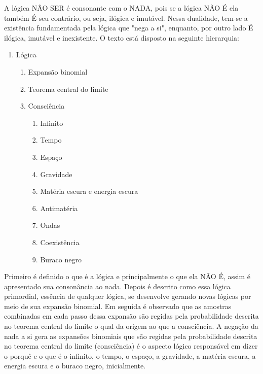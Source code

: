 A lógica NÃO SER é consonante com o NADA, pois se a lógica NÃO É ela também É seu contrário, ou seja, ilógica e imutável. Nessa dualidade, tem-se a existência fundamentada pela lógica que "nega a si", enquanto, por outro lado É ilógica, imutável e inexistente. O texto está disposto na seguinte hierarquia:
{\small
\begin{enumerate}[label*=\arabic*.]
   \item Lógica
   \begin{enumerate}[label*=\arabic*.]
	   \item Expansão binomial
	   \item Teorema central do limite
	   \item Consciência
		   \begin{enumerate}[label*=\arabic*.]
			   \item Infinito
			   \item Tempo
			   \item Espaço
			   \item Gravidade
			   \item Matéria escura e energia escura
			   \item Antimatéria
			   \item Ondas
			   \item Coexistência
			   \item Buraco negro
		   \end{enumerate}   
   \end{enumerate}
\end{enumerate}
}
Primeiro é definido o que é a lógica e principalmente o que ela NÃO É, assim é apresentado sua consonância ao nada. Depois é descrito como essa lógica primordial, essência de qualquer lógica, se desenvolve gerando novas lógicas por meio de sua expansão binomial. Em seguida é observado que as amostras combinadas em cada passo dessa expansão são regidas pela probabilidade descrita no teorema central do limite o qual da origem ao que a consciência. A negação da nada a si gera as expansões binomiais que são regidas pela probabilidade descrita no teorema central do limite (consciência) é o aspecto lógico responsável em dizer o porquê e o que é o infinito, o tempo, o espaço, a gravidade, a matéria escura, a energia escura e o buraco negro, inicialmente. 